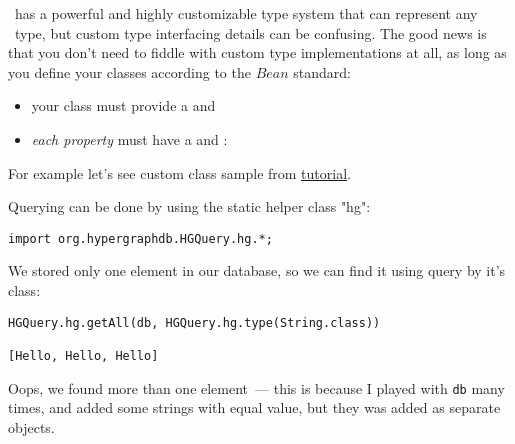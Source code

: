 
\hgdb\ has a powerful and highly customizable type system that can represent any
\java\ type, but custom type interfacing details can be confusing. The good news
is that you don't need to fiddle with custom type implementations at all,
as long as you define your classes according to the \java$Bean$ standard:
\begin{itemize}[nosep]
\item your class must provide a  and
\item \emph{each property} must have a  and :
\end{itemize}

For example let's see custom class sample from
\href{https://github.com/hypergraphdb/hypergraphdb/wiki/GettingStarted}{tutorial}.

\clearpage
{}

Querying can be done by using the static helper class "hg":
\begin{verbatim}
import org.hypergraphdb.HGQuery.hg.*;
\end{verbatim}

We stored only one element in our database, so we can find it using query by
it's class:
\begin{verbatim}
HGQuery.hg.getAll(db, HGQuery.hg.type(String.class))

[Hello, Hello, Hello]
\end{verbatim}

Oops, we found more than one element\ --- this is because I played with
\verb$db$ many times, and added some strings with equal value, but they was
added as separate objects.

\secup